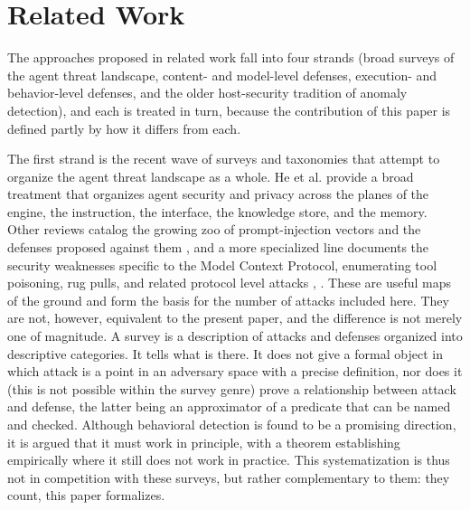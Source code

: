\documentclass[journal]{IEEEtran}
\theoremstyle{remark}
\begin{document}
\section{Related Work}

The approaches proposed in related work fall into four strands (broad surveys of the agent threat landscape, content- and model-level defenses, execution- and behavior-level defenses, and the older host-security tradition of anomaly detection), and each is treated in turn, because the contribution of this paper is defined partly by how it differs from each.

The first strand is the recent wave of surveys and taxonomies that attempt to organize the agent threat landscape as a whole. He et al. \cite{r25} provide a broad treatment that organizes agent security and privacy across the planes of the engine, the instruction, the interface, the knowledge store, and the memory. Other reviews catalog the growing zoo of prompt-injection vectors and the defenses proposed against them \cite{r26}, and a more specialized line documents the security weaknesses specific to the Model Context Protocol, enumerating tool poisoning, rug pulls, and related protocol level attacks \cite{r3}, \cite{r11}. These are useful maps of the ground and form the basis for the number of attacks included here. They are not, however, equivalent to the present paper, and the difference is not merely one of magnitude. A survey is a description of attacks and defenses organized into descriptive categories. It tells what is there. It does not give a formal object in which attack is a point in an adversary space with a precise definition, nor does it (this is not possible within the survey genre) prove a relationship between attack and defense, the latter being an approximator of a predicate that can be named and checked. Although behavioral detection is found to be a promising direction, it is argued that it must work in principle, with a theorem establishing empirically where it still does not work in practice. This systematization is thus not in competition with these surveys, but rather complementary to them: they count, this paper formalizes.
\end{document}
